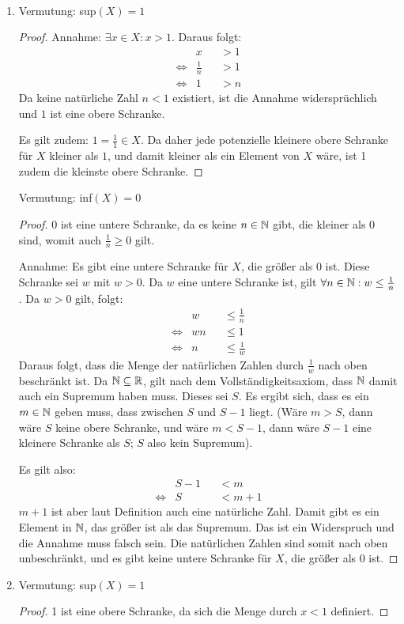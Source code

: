 \begin{lsg}\mbox{ }
\begin{enumerate}[label=$\mathrm{(\roman*)}$, ref=$\mathrm{\roman*}$]
\item 
Vermutung: sup$(X)=1$
\begin{proof}
Annahme: $\exists x \in X:x>1$. Daraus folgt:
\begin{align*}
&x&&>1 \\
\iff &\frac{1}{n}&&>1 \\
\iff &1&&>n 
\end{align*}  
Da keine natürliche Zahl $n<1$ existiert, ist die Annahme widersprüchlich und $1$ ist eine obere Schranke.

Es gilt zudem: $1=\frac{1}{1}\in X$. Da daher jede potenzielle kleinere obere Schranke für $X$ kleiner als $1$, und damit kleiner als ein Element von $X$ wäre, ist 1 zudem die kleinste obere Schranke.
\end{proof}

Vermutung: inf$(X)=0$
\begin{proof}
0 ist eine untere Schranke, da es keine $n \in \mathbb{N}$ gibt, die kleiner als 0 sind, womit auch $\frac{1}{n} \geq 0$ gilt.

Annahme: Es gibt eine untere Schranke für $X$, die größer als 0 ist. Diese Schranke sei $w$ mit $w>0$. Da $w$ eine untere Schranke ist, gilt $\forall n\in \mathbb{N}: w \leq \frac{1}{n}$. Da $w>0$ gilt, folgt:
\begin{align*}
&w &&\leq \frac{1}{n} \\
\iff &wn &&\leq 1 \\
\iff &n &&\leq \frac{1}{w} 
\end{align*}
Daraus folgt, dass die Menge der natürlichen Zahlen durch $\frac{1}{w}$ nach oben beschränkt ist.
Da $\mathbb{N} \subseteq \mathbb{R}$, gilt nach dem Vollständigkeitsaxiom, dass $\mathbb{N}$ damit auch ein Supremum haben muss. Dieses sei $S$. Es ergibt sich, dass es ein $m \in \mathbb{N}$ geben muss, dass zwischen $S$ und $S-1$ liegt. (Wäre $m>S$, dann wäre $S$ keine obere Schranke, und wäre $m<S-1$, dann wäre $S-1$ eine kleinere Schranke als $S$; $S$ also kein Supremum).

Es gilt also:
\begin{align*}
&S-1&&<m \\
\iff &S&&<m+1 
\end{align*}
$m+1$ ist aber laut Definition auch eine natürliche Zahl. Damit gibt es ein Element in $\mathbb{N}$, das größer ist als das Supremum. Das ist ein Widerspruch und die Annahme muss falsch sein. Die natürlichen Zahlen sind somit nach oben unbeschränkt, und es gibt keine untere Schranke für $X$, die größer als 0 ist. 
\end{proof}
\item 
Vermutung: sup$(X)=1$
\begin{proof}
1 ist eine obere Schranke, da sich die Menge durch $x<1$ definiert.


\end{proof}
\end{enumerate}
\end{lsg}
